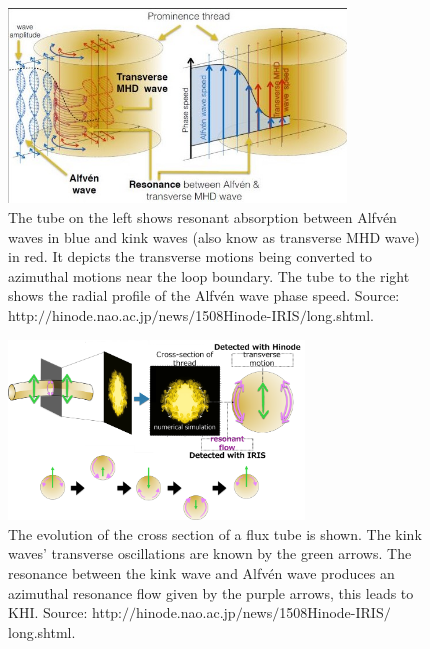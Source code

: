\documentclass[12pt,a4paper,twoside]{article}
\newcommand{\Alfven}{Alfv\'{e}n }
\begin{document}
\begin{figure}[h]
\centering
\includegraphics[width = 0.8\textwidth]{fig7el_s}
\caption{  The tube on the left shows resonant absorption between \Alfven waves in blue and kink waves (also know as transverse MHD wave) in red. It depicts the transverse motions being converted to azimuthal motions near the loop boundary. The tube to the right shows the radial profile of the \Alfven wave phase speed. Source:  http:$//$hinode.nao.ac.jp$/$news$/$1508Hinode-IRIS$/$long.shtml.}
\label{fig_3_1}
\end{figure} 
\begin{figure}[h]
\centering
\includegraphics[width = 0.7\textwidth]{res_abs_mot}
\caption{The evolution of the cross section of a flux tube is shown. The kink waves' transverse oscillations are known by the green arrows. The resonance between the kink wave and \Alfven wave produces an azimuthal resonance flow given by the purple arrows, this leads to KHI. Source: http:$//$hinode.nao.ac.jp$/$news$/$1508Hinode-IRIS$/$long.shtml. }
\label{fig_14}
\end{figure} 
\end{document}
